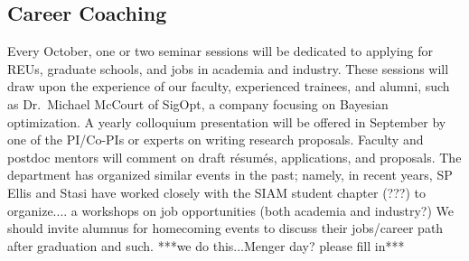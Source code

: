 \documentclass[11pt]{NSFamsart}
\begin{document}
\subsection*{Career Coaching}
Every October, one or two seminar sessions will be dedicated to applying for REUs, graduate schools, and jobs in academia and industry. These sessions will draw upon the experience of our faculty, experienced trainees, and alumni, such as Dr.\ Michael McCourt of SigOpt, a company focusing on Bayesian optimization.  A yearly colloquium presentation  will be offered in September by one of the PI/Co-PIs or experts on writing research proposals. Faculty and postdoc mentors will comment on draft r\'esum\'es,  applications, and proposals.  
The department has organized similar events in the past; namely, 
in recent years, SP Ellis and Stasi have worked closely with the SIAM student chapter (???) to organize.... a workshops on job opportunities (both academia and industry?)
We should invite alumnus for homecoming events to discuss their jobs/career path after graduation and such. {\color{red}***we do this...Menger day? please fill in***}






\end{document}
